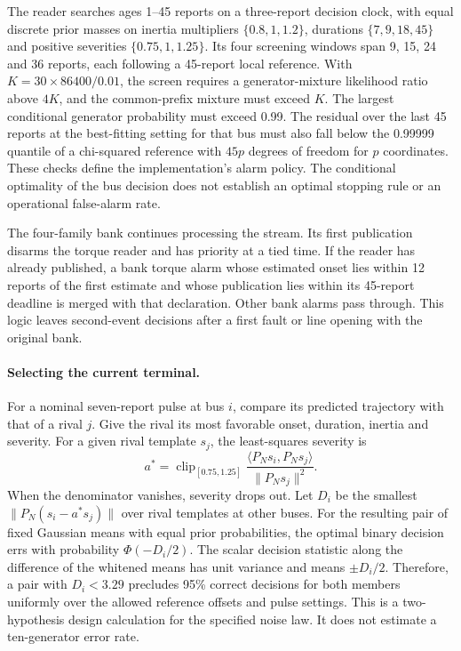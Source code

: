 The reader searches ages 1--45 reports on a three-report decision
clock, with equal discrete prior masses on inertia multipliers
$\{0.8,1,1.2\}$, durations $\{7,9,18,45\}$ and positive severities
$\{0.75,1,1.25\}$. Its four screening windows span 9, 15, 24 and
36 reports, each following a 45-report local reference. With
$K=30\times86400/0.01$, the screen requires a generator-mixture
likelihood ratio above $4K$, and the common-prefix
mixture must exceed $K$. The largest conditional generator
probability must exceed 0.99. The residual over the last 45 reports
at the best-fitting setting for that bus must also fall below the
0.99999 quantile of a chi-squared reference with $45p$ degrees of
freedom for $p$ coordinates. These checks define the implementation's
alarm policy. The conditional optimality of the bus decision does
not establish an optimal stopping rule or an operational false-alarm
rate.

The four-family bank continues processing the stream. Its first
publication disarms the torque reader and has priority at a tied
time. If the reader has already published, a bank torque alarm whose
estimated onset lies within 12 reports of the first estimate and
whose publication lies within its 45-report deadline is merged with
that declaration. Other bank alarms pass through. This logic leaves
second-event decisions after a first fault or line opening with the
original bank.

\paragraph{Selecting the current terminal.}
For a nominal seven-report pulse at bus $i$, compare its predicted
trajectory with that of a rival $j$. Give the rival its most favorable
onset, duration, inertia and severity. For a given rival template
$s_j$, the least-squares severity is
\[
 a^*=\operatorname{clip}_{[0.75,1.25]}
 \frac{\langle P_Ns_i,P_Ns_j\rangle}{\|P_Ns_j\|^2}.
\]
When the denominator vanishes, severity drops out. Let $D_i$ be the
smallest $\|P_N(s_i-a^*s_j)\|$ over rival templates at other buses.
For the resulting pair of fixed Gaussian means with equal prior
probabilities, the optimal binary decision errs with probability
$\Phi(-D_i/2)$. The scalar decision statistic along the difference
of the whitened means has unit variance and means $\pm D_i/2$.
Therefore, a pair with $D_i<3.29$ precludes 95\% correct decisions
for both members uniformly over the allowed reference offsets and
pulse settings. This is a two-hypothesis design calculation for the
specified noise law. It does not estimate a ten-generator error rate.

